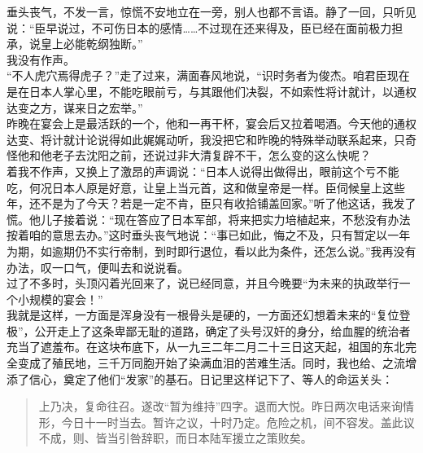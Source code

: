 垂头丧气，不发一言，惊慌不安地立在一旁，别人也都不言语。静了一回，只听见说：“臣早说过，不可伤日本的感情……不过现在还来得及，臣已经在面前极力担承，说皇上必能乾纲独断。”\\

我没有作声。\\

“不人虎穴焉得虎子？”走了过来，满面春风地说，“识时务者为俊杰。咱君臣现在是在日本人掌心里，不能吃眼前亏，与其跟他们决裂，不如索性将计就计，以通权达变之方，谋来日之宏举。”\\

昨晚在宴会上是最活跃的一个，他和一再干杯，宴会后又拉着喝酒。今天他的通权达变、将计就计论说得如此娓娓动听，我没把它和昨晚的特殊举动联系起来，只奇怪他和他老子去沈阳之前，还说过非大清复辟不干，怎么变的这么快呢？\\

着我不作声，又换上了激昂的声调说：“日本人说得出做得出，眼前这个亏不能吃，何况日本人原是好意，让皇上当元首，这和做皇帝是一样。臣伺候皇上这些年，还不是为了今天？若是一定不肯，臣只有收拾铺盖回家。”听了他这话，我发了慌。他儿子接着说：“现在答应了日本军部，将来把实力培植起来，不愁没有办法按着咱的意思去办。”这时垂头丧气地说：“事已如此，悔之不及，只有暂定以一年为期，如逾期仍不实行帝制，到时即行退位，看以此为条件，还怎么说。”我再没有办法，叹一口气，便叫去和说说看。\\

过了不多时，头顶闪着光回来了，说已经同意，并且今晚要“为未来的执政举行一个小规模的宴会！”\\

我就是这样，一方面是浑身没有一根骨头是硬的，一方面还幻想着未来的“复位登极”，公开走上了这条卑鄙无耻的道路，确定了头号汉奸的身分，给血腥的统治者充当了遮羞布。在这块布底下，从一九三二年二月二十三日这天起，祖国的东北完全变成了殖民地，三千万同胞开始了染满血泪的苦难生活。同时，我也给、之流增添了信心，奠定了他们“发家”的基石。日记里这样记下了、等人的命运关头：\\

\begin{quote}
	上乃决，复命往召。遂改“暂为维持”四字。退而大悦。昨日两次电话来询情形，今日十一时当去。暂许之议，十时乃定。危险之机，间不容发。盖此议不成，则、皆当引咎辞职，而日本陆军援立之策败矣。\\
\end{quote}

